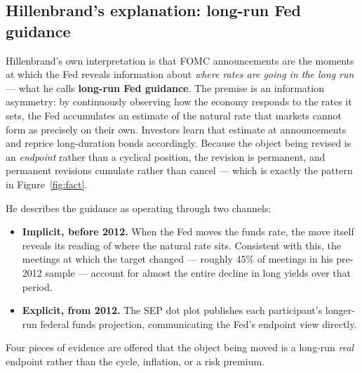 \subsection{Hillenbrand's explanation: long-run Fed guidance}

Hillenbrand's own interpretation is that FOMC announcements are the moments at which the Fed
reveals information about \emph{where rates are going in the long run} --- what he calls
\textbf{long-run Fed guidance}. The premise is an information asymmetry: by continuously
observing how the economy responds to the rates it sets, the Fed accumulates an estimate of
the natural rate that markets cannot form as precisely on their own. Investors learn that
estimate at announcements and reprice long-duration bonds accordingly. Because the object
being revised is an \emph{endpoint} rather than a cyclical position, the revision is
permanent, and permanent revisions cumulate rather than cancel --- which is exactly the
pattern in Figure~\ref{fig:fact}.

He describes the guidance as operating through two channels:

\begin{itemize}\setlength\itemsep{0.15em}
\item \textbf{Implicit, before 2012.} When the Fed moves the funds rate, the move itself
reveals its reading of where the natural rate sits. Consistent with this, the meetings at
which the target changed --- roughly 45\% of meetings in his pre-2012 sample --- account for
almost the entire decline in long yields over that period.
\item \textbf{Explicit, from 2012.} The SEP dot plot publishes each participant's longer-run
federal funds projection, communicating the Fed's endpoint view directly.
\end{itemize}

\noindent Four pieces of evidence are offered that the object being moved is a long-run
\emph{real} endpoint rather than the cycle, inflation, or a risk premium.

